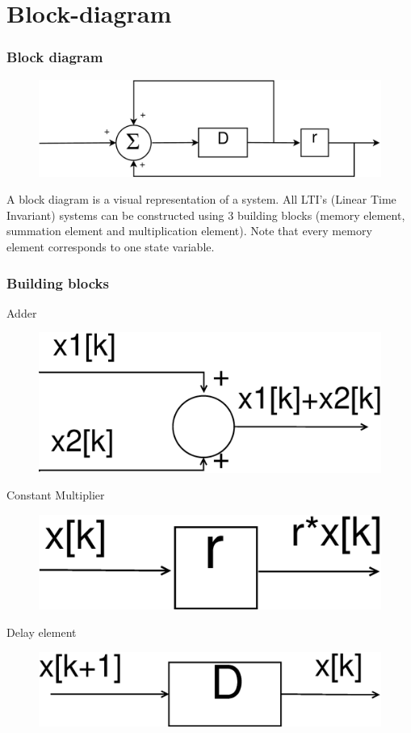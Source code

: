 \section{Block-diagram}
\begin{frame}
	\frametitle{Block diagram}
			\begin{figure}
				\centering
				\includegraphics[width=0.7\linewidth]{Images/Discrete_time_eps_3}
			\end{figure}


	\vspace{-1.5em}
	\begin{definition}
			A block diagram is a visual representation of a system. All LTI's (Linear Time Invariant) systems can be constructed using 3 building blocks (memory element, summation element and multiplication element). Note that every memory element corresponds to one state variable.
	\end{definition}
\end{frame}
\begin{frame}
	\frametitle{Building blocks}
	
			\begin{block}{Adder}
			\begin{figure}
				\centering
				\includegraphics[width=0.3\linewidth]{Images/Discrete_time_eps_5.eps}

			\end{figure}


			\end{block}
		
		
				\begin{block}{Constant Multiplier}
					\begin{figure}
					\centering
					\includegraphics[width=0.3\linewidth]{Images/Discrete_time_eps_6.eps}
					\end{figure}
				\end{block}
	
			\begin{block}{Delay element}
				\begin{figure}
					\centering
					\includegraphics[width=0.3\linewidth]{Images/Discrete_time_eps_7.eps}
				\end{figure}
			\end{block}
	
\end{frame}
